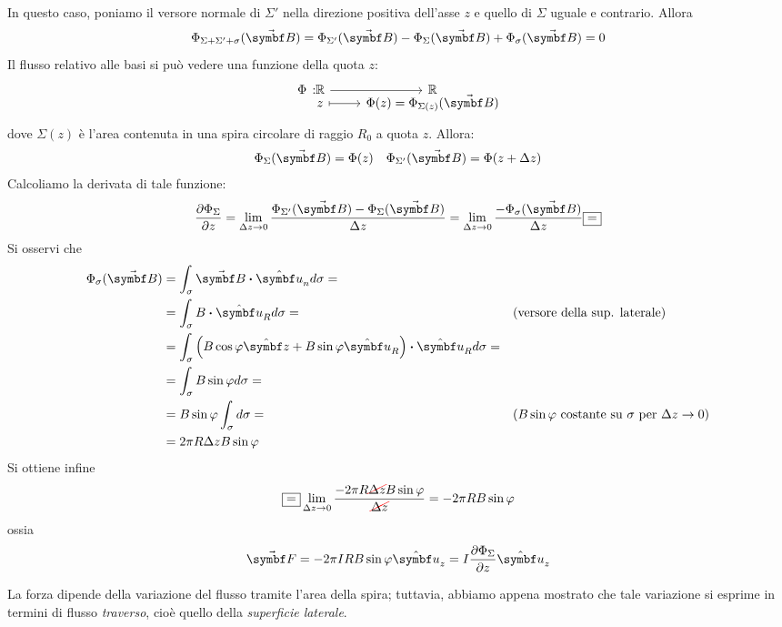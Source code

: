 In questo caso, poniamo il versore normale di $\Sigma'$ nella direzione positiva dell'asse $z$ e quello di $\Sigma$ uguale e contrario. Allora
\begin{equation*}
	\Phi_{\Sigma+\Sigma'+\sigma}(\vba{B})=\Phi_{\Sigma'}(\vba{B})-\Phi_{\Sigma}(\vba{B})+\Phi_{\sigma}(\vba{B})=0
\end{equation*}
Il flusso relativo alle basi si può vedere una funzione della quota $z$:
\begin{equation*}
	\funztot[\Phi]{\realset}{\realset}{z}{\Phi(z)=\Phi_{\Sigma(z)}(\vba{B})}
\end{equation*}
dove $\Sigma(z)$ è l'area contenuta in una spira circolare di raggio $R_0$ a quota $z$. Allora:
\begin{align*}
	\Phi_{\Sigma}(\vba{B})=\Phi(z)&&\Phi_{\Sigma'}(\vba{B})=\Phi(z+\Delta z)
\end{align*}
Calcoliamo la derivata di tale funzione:
\begin{equation*}
	\pdv{\Phi_{\Sigma}}{z}=\lim_{\Delta z\to 0}\frac{\Phi_{\Sigma'}(\vba{B})-\Phi_{\Sigma}(\vba{B})}{\Delta z}=\lim_{\Delta z\to 0}\frac{-\Phi_{\sigma}(\vba{B})}{\Delta z}\squarequal
\end{equation*}
Si osservi che
\begin{align*}
	\Phi_{\sigma}(\vba{B})&=\int_{\sigma}\vba{B}\vdot\vbh{u}_nd\sigma=&&\\
	&=\int_{\sigma}B\vdot\vbh{u}_Rd\sigma=&&\text{(versore della sup. laterale)}\\
	&=\int_{\sigma}\left(B\cos\phi\vbh{z}+B\sin\phi\vbh{u}_R\right)\vdot\vbh{u}_Rd\sigma=&&\\
	&=\int_{\sigma}B\sin\phi d\sigma=&&\\
	&=B\sin\phi\int_{\sigma}d\sigma=&&\text{(}B\sin\phi\ \text{costante su}\ \sigma\ \text{per}\ \Delta z\to 0\text{)}\\
	&=2\pi R \Delta z B\sin\phi&&
\end{align*}
Si ottiene infine
\begin{equation*}
	\squarequal\lim_{\Delta z\to 0}\frac{-2\pi R \Ccancel[red]{\Delta z} B\sin\phi}{\Ccancel[red]{\Delta z}}=-2\pi R B\sin\phi
\end{equation*}
ossia
\begin{equation}
	\vba{F}=-2\pi IRB\sin\phi\vbh{u}_z=I\pdv{\Phi_{\Sigma}}{z}\vbh{u}_z
\end{equation}
\begin{observe}
	La forza dipende della variazione del flusso tramite l'area della spira; tuttavia, abbiamo appena mostrato che tale variazione si esprime in termini di flusso \textit{traverso}, cioè quello della \textit{superficie laterale}.
\end{observe}
